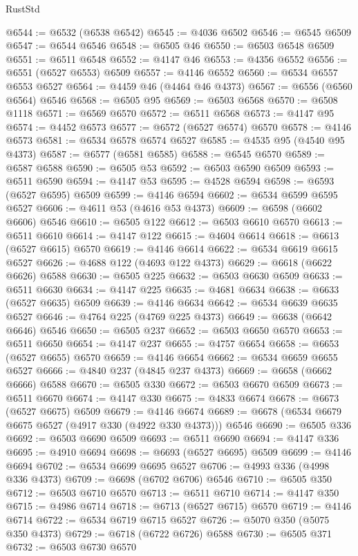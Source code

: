 \begin{lexlean}{RustStd}
\begin{coremodule}
@6544 := @6532 (@6538 @6542)
@6545 := @4036 @6502
@6546 := @6545 @6509
@6547 := @6544 @6546
@6548 := @6505 @46
@6550 := @6503 @6548 @6509
@6551 := @6511 @6548
@6552 := @4147 @46
@6553 := @4356 @6552
@6556 := @6551 (@6527 @6553) @6509
@6557 := @4146 @6552
@6560 := @6534 @6557 @6553 @6527
@6564 := @4459 @46 (@4464 @46 @4373)
@6567 := @6556 (@6560 @6564) @6546
@6568 := @6505 @95
@6569 := @6503 @6568
@6570 := @6508 @1118
@6571 := @6569 @6570
@6572 := @6511 @6568
@6573 := @4147 @95
@6574 := @4452 @6573
@6577 := @6572 (@6527 @6574) @6570
@6578 := @4146 @6573
@6581 := @6534 @6578 @6574 @6527
@6585 := @4535 @95 (@4540 @95 @4373)
@6587 := @6577 (@6581 @6585)
@6588 := @6545 @6570
@6589 := @6587 @6588
@6590 := @6505 @53
@6592 := @6503 @6590 @6509
@6593 := @6511 @6590
@6594 := @4147 @53
@6595 := @4528 @6594
@6598 := @6593 (@6527 @6595) @6509
@6599 := @4146 @6594
@6602 := @6534 @6599 @6595 @6527
@6606 := @4611 @53 (@4616 @53 @4373)
@6609 := @6598 (@6602 @6606) @6546
@6610 := @6505 @122
@6612 := @6503 @6610 @6570
@6613 := @6511 @6610
@6614 := @4147 @122
@6615 := @4604 @6614
@6618 := @6613 (@6527 @6615) @6570
@6619 := @4146 @6614
@6622 := @6534 @6619 @6615 @6527
@6626 := @4688 @122 (@4693 @122 @4373)
@6629 := @6618 (@6622 @6626) @6588
@6630 := @6505 @225
@6632 := @6503 @6630 @6509
@6633 := @6511 @6630
@6634 := @4147 @225
@6635 := @4681 @6634
@6638 := @6633 (@6527 @6635) @6509
@6639 := @4146 @6634
@6642 := @6534 @6639 @6635 @6527
@6646 := @4764 @225 (@4769 @225 @4373)
@6649 := @6638 (@6642 @6646) @6546
@6650 := @6505 @237
@6652 := @6503 @6650 @6570
@6653 := @6511 @6650
@6654 := @4147 @237
@6655 := @4757 @6654
@6658 := @6653 (@6527 @6655) @6570
@6659 := @4146 @6654
@6662 := @6534 @6659 @6655 @6527
@6666 := @4840 @237 (@4845 @237 @4373)
@6669 := @6658 (@6662 @6666) @6588
@6670 := @6505 @330
@6672 := @6503 @6670 @6509
@6673 := @6511 @6670
@6674 := @4147 @330
@6675 := @4833 @6674
@6678 := @6673 (@6527 @6675) @6509
@6679 := @4146 @6674
@6689 := @6678 (@6534 @6679 @6675 @6527 (@4917 @330 (@4922 @330 @4373))) @6546
@6690 := @6505 @336
@6692 := @6503 @6690 @6509
@6693 := @6511 @6690
@6694 := @4147 @336
@6695 := @4910 @6694
@6698 := @6693 (@6527 @6695) @6509
@6699 := @4146 @6694
@6702 := @6534 @6699 @6695 @6527
@6706 := @4993 @336 (@4998 @336 @4373)
@6709 := @6698 (@6702 @6706) @6546
@6710 := @6505 @350
@6712 := @6503 @6710 @6570
@6713 := @6511 @6710
@6714 := @4147 @350
@6715 := @4986 @6714
@6718 := @6713 (@6527 @6715) @6570
@6719 := @4146 @6714
@6722 := @6534 @6719 @6715 @6527
@6726 := @5070 @350 (@5075 @350 @4373)
@6729 := @6718 (@6722 @6726) @6588
@6730 := @6505 @371
@6732 := @6503 @6730 @6570

\end{coremodule}
\end{lexlean}

